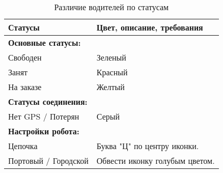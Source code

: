 			\begin{table} 
				\caption {Различие водителей по статусам}
				\setlength{\extrarowheight}{2mm}
				\label{status_dif}
				\begin{tabular}{|p{4cm}|p{8cm}|}

				    \hline	\textbf{Статусы} &\textbf{Цвет, описание, требования} \\ [2mm]


				    \hline	\textbf{Основные статусы:} & \\ [2mm]
					    \hline	Свободен & Зеленый\\ [2mm]
					    \hline	Занят & Красный\\ [2mm]
					    \hline	На заказе & Желтый\\ [2mm]

				    \hline	\textbf{Статусы соединения:} & \\ [2mm]
				  	  \hline	Нет GPS / Потерян & Серый\\ [2mm]

				    \hline	\textbf{Настройки робота:} & \\ [2mm]
					    \hline	Цепочка & Буква "Ц" по центру иконки.\\ [2mm]
					    \hline	Портовый / Городской & Обвести иконку голубым цветом.\\ [2mm]

					\hline 
				\end{tabular} 
			\end{table}

